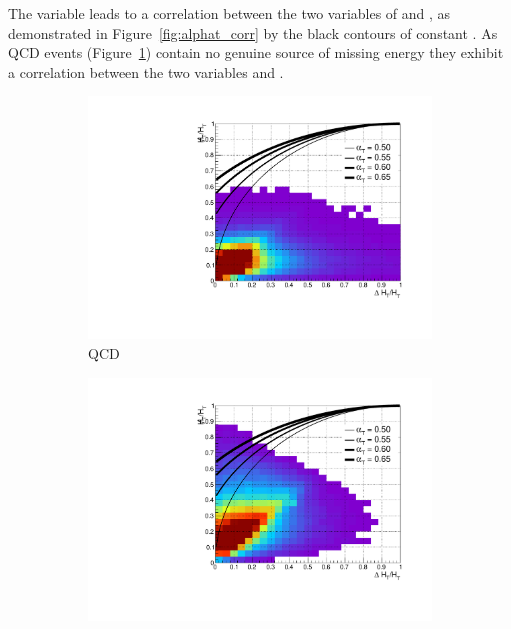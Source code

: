 The \alphat variable leads to a correlation between the two variables of \mht
and \deltaHT, as demonstrated in Figure~\ref{fig:alphat_corr} by the black contours of
constant \alphat. 
As QCD events (Figure~\ref{fig:alphat_corr_qcd}) contain no genuine source of missing
energy they exhibit a correlation between the two variables \mht and \deltaHT. 
%
\begin{figure}[b!]
  \centering
  \begin{subfigure}[t]{.46\textwidth}
    \includegraphics[width=\textwidth]{Figs/alphat/alphat_correlation_QCD_ge4j_done3.pdf}
    \caption{QCD}
    \label{fig:alphat_corr_qcd}
  \end{subfigure}
  \begin{subfigure}[t]{.46\textwidth}
    \includegraphics[width=\textwidth]{Figs/alphat/alphat_correlation_Zinv_ge4j_done3.pdf}

\end{subfigure}
\end{figure}
